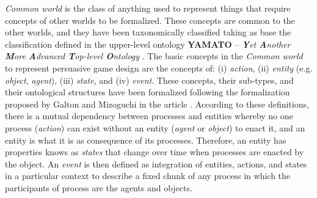 \emph{Common world} is the class of anything used to represent things that require concepts of other worlds to be formalized. These concepts are common to the other worlds, and they have been taxonomically classified taking as base the classification defined in the upper-level ontology \textbf{YAMATO} – \emph{\textbf{Y}et \textbf{A}nother \textbf{M}ore \textbf{A}dvanced \textbf{T}op-level \textbf{O}ntology} \cite{Mizoguchi2010}. The basic concepts in the \emph{Common world} to represent persuasive game design are the concepts of: (i) \emph{action}, (ii) \emph{entity} (e.g. \emph{object}, \emph{agent}), (iii) \emph{state}, and (iv) \emph{event}. These concepts, their sub-types, and their ontological structures have been formalized following the formalization proposed by Galton and Mizoguchi in the article  \cite{GaltonMizoguchi2009}. According to these definitions, there is a mutual dependency between processes and entities whereby no one process (\emph{action}) can exist without an entity (\emph{agent} or \emph{object}) to enact it, and an entity is what it is as consequence of its processes. Therefore, an entity has properties knows as \emph{states} that change over time when processes are enacted by the object. An \emph{event} is then defined as integration of entities, actions, and states in a particular context to describe a fixed chunk of any process in which the participants of process are the agents and objects.


